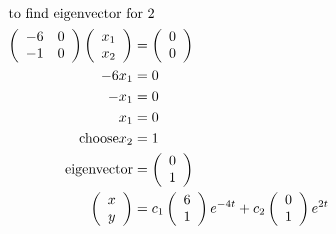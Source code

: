 \documentclass{article}
\begin{document}
\begin{align*}
  \intertext{to find eigenvector for 2}
  \left(\begin{array}{cc}-6&0\\-1&0\end{array}\right)\left(\begin{array}{c}x_1\\x_2\end{array}\right)&=\left(\begin{array}{c}0\\0\end{array}\right)\\
  -6x_1&=0\\
  -x_1&=0\\
  x_1&=0\\
  \text{choose} x_2&=1\\
  \text{eigenvector}&=\left(\begin{array}{c}0\\1\end{array}\right)\\
  \left(\begin{array}{c}x\\y\end{array}\right)&=c_1\left(\begin{array}{c}6\\1\end{array}\right)e^{-4t}+c_2\left(\begin{array}{c}0\\1\end{array}\right)e^{2t}
\end{align*}
\end{document}
